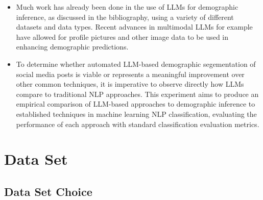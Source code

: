 \documentclass{report}
\begin{document}
\begin{itemize}
\item Much work has already been done in the use of LLMs for demographic inference, as discussed in the bibliography,  using a variety of different datasets and data types. Recent advances in multimodal LLMs for example have allowed for profile pictures and other image data to be used in enhancing demographic predictions.

\item To determine whether automated LLM-based demographic segementation of social media posts is viable or represents a meaningful improvement over other common techniques, it is imperative to observe directly how LLMs compare to traditional NLP approaches. This experiment aims to produce an empirical comparison of LLM-based approaches to demographic inference to established techniques in machine learning NLP classification, evaluating the performance of each approach with standard classification evaluation metrics.
\end{itemize}

\section{Data Set}

\subsection{Data Set Choice}
\end{document}
